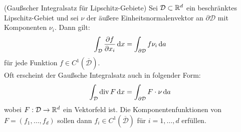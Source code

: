 %	


\begin{Satz} (Gaußscher Integralsatz für Lipschitz-Gebiete) \newline
 	Sei $\mathcal{D}  \subset \mathbb{R}^d$ ein beschränktes Lipschitz-Gebiet und sei $\nu$ der äußere Einheitsnormalenvektor an $\partial \mathcal{D}$ mit Komponenten $ \nu_i $. Dann gilt:
 		\begin{align*}
	 		\int_{\mathcal{D}} \frac{\partial f}{\partial x_i} \, \mathrm{d} x  = \int_{\partial \mathcal{D}} f \nu_i \, \mathrm{d} a
 		\end{align*}
 		für jede Funktion $f \in C^1(\overline{\mathcal{D}})$. \\ 
 		Oft erscheint der Gaußsche Integralsatz auch in folgender Form:
 		\begin{align*}
 		\int_{\mathcal{D}} \operatorname{div} F \, \mathrm{d} x =  \int_{\partial \mathcal{D}} F \cdot \nu \, \mathrm{d} a
 		\end{align*}
 		wobei $F:\mathcal{D} \to \mathbb{R}^d$ ein Vektorfeld ist. Die Komponentenfunktionen von $F = (f_1,\dots,f_d)$ sollen dann $f_i \in C^1(\overline{\mathcal{D}})$ für $i=1,\dots,d$ erfüllen.
\end{Satz}

